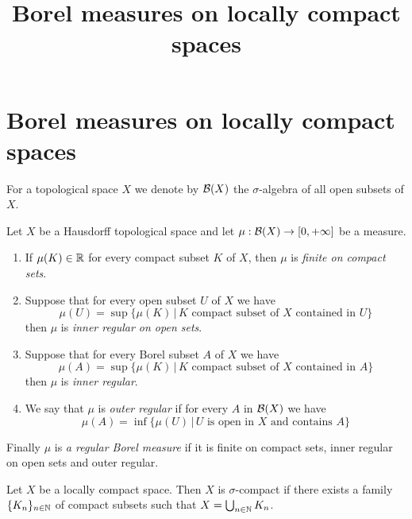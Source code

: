 



\title{Borel measures on locally compact spaces}
\date{}
\maketitle

\section{Borel measures on locally compact spaces}
\noindent
For a topological space $X$ we denote by ${\mathcal B}(X)$ the $\sigma$-algebra of all open subsets of $X$.

\begin{definition}
Let $X$ be a Hausdorff topological space and let $\mu:{\mathcal B}(X)\rightarrow [0,+\infty]$ be a measure.
\begin{enumerate}[label=\textbf{(\arabic*)}, leftmargin=1.5em]
\item If $\mu(K)\in {\mathbb R}$ for every compact subset $K$ of $X$, then $\mu$ is \textit{finite on compact sets}.
\item Suppose that for every open subset $U$ of $X$ we have
$$\mu(U) = \sup \big\{\mu(K)\,\big|\,K\mbox{ compact subset of }X\mbox{ contained in }U\big\}$$
then $\mu$ is \textit{inner regular on open sets}.
\item Suppose that for every Borel subset $A$ of $X$ we have
$$\mu(A) = \sup \big\{\mu(K)\,\big|\,K\mbox{ compact subset of }X\mbox{ contained in }A\big\}$$
then $\mu$ is \textit{inner regular}.
\item  We say that $\mu$ is \textit{outer regular} if for every $A$ in ${\mathcal B}(X)$ we have
$$\mu(A) = \inf \big\{\mu(U)\,\big|\,U\mbox{ is open in }X\mbox{ and contains }A\big\}$$
\end{enumerate}
Finally $\mu$ is \textit{a regular Borel measure} if it is finite on compact sets, inner regular on open sets and outer regular. 
\end{definition}

\begin{definition}
Let $X$ be a locally compact space. Then $X$ is $\sigma$-compact if there exists a family $\{K_n\}_{n\in {\mathbb N}}$ of compact subsets such that $X =\bigcup_{n\in {\mathbb N}}K_n$.
\end{definition}

